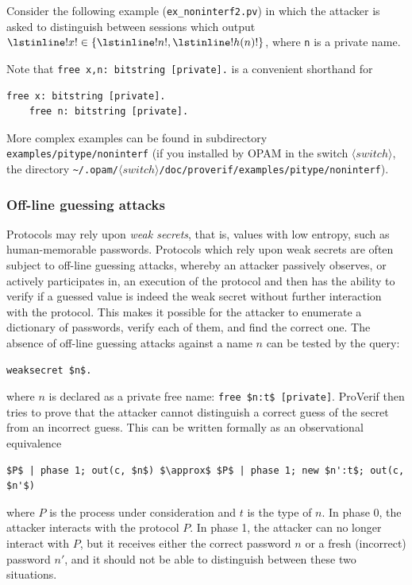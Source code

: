 \documentclass{book}
\newcommand{\nonterm}[1]{\langle\mathit{#1}\rangle}
\newcommand{\switchdir}{\nonterm{switch}}
\newcommand{\opamsubdir}[1]{\nolinkurl{~/.opam/}$\switchdir$\nolinkurl{/#1}}
\begin{document}
Consider the following example (\texttt{{\docexdir}ex\_noninterf2.pv}) in which the attacker is asked to distinguish
between sessions which output $\lstinline!x! \in \{\lstinline!n!,\lstinline!h(n)!\}$, where \lstinline!n! is a private
name.
%

%
Note that \lstinline!free x,n: bitstring [private].! is a convenient shorthand for
\begin{lstlisting}[numbers=none]
	free x: bitstring [private].
	free n: bitstring [private].
\end{lstlisting}
More complex examples can be found in subdirectory
{\tt examples/pitype/noninterf} (if you installed by OPAM
in the switch $\switchdir$, the directory \opamsubdir{doc/proverif/examples/pitype/noninterf}).


\subsubsection{Off-line guessing attacks}\label{sec:weakSecret}

Protocols may rely upon \emph{weak secrets}, that is, values with low
entropy, such as human-memorable passwords. Protocols which rely upon
weak secrets are often subject to off-line guessing attacks, whereby an
attacker passively observes, or actively participates in, an execution
of the protocol and then has the ability to verify if a guessed value
is indeed the weak secret without further interaction with the
protocol. This makes it possible for the attacker to enumerate a
dictionary of passwords, verify each of them, and find the correct
one. The absence of off-line guessing attacks against a name $n$ can be
tested by the query:
%
\begin{lstlisting}[numbers=none]
	weaksecret $n$.
\end{lstlisting}
where $n$ is declared as a private free name: \lstinline!free $n:t$ [private]!.
ProVerif then tries to prove that the attacker cannot distinguish a
correct guess of the secret from an incorrect guess. This can be written
formally as an observational equivalence
\begin{lstlisting}[numbers=none]
  $P$ | phase 1; out(c, $n$) $\approx$ $P$ | phase 1; new $n':t$; out(c, $n'$)
\end{lstlisting}
where $P$ is the process under consideration and $t$ is the type of $n$.
In phase 0, the attacker interacts with the protocol $P$.
In phase 1, the attacker can no longer interact with $P$, but it receives
either the correct password $n$ or a fresh (incorrect) password $n'$,
and it should not be able to distinguish between these two situations.
\end{document}
